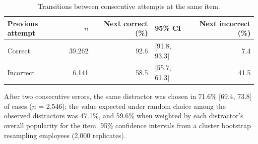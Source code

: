 \begin{table}[htbp]
\centering
\caption{Transitions between consecutive attempts at the same item.}
\label{tab:transitions}
\small
\begin{tabular}{lrrlr}
\toprule
Previous attempt & $n$ & Next correct (\%) & 95\% CI & Next incorrect (\%) \\
\midrule
Correct & 39,262 & 92.6 & [91.8, 93.3] & 7.4 \\
Incorrect & 6,141 & 58.5 & [55.7, 61.3] & 41.5 \\
\bottomrule
\end{tabular}

\vspace{2pt}
\parbox{\linewidth}{\footnotesize After two consecutive errors, the same distractor was chosen in 71.6\% [69.4, 73.8] of cases ($n$ = 2,546); the value expected under random choice among the observed distractors was 47.1\%, and 59.6\% when weighted by each distractor's overall popularity for the item. 95\% confidence intervals from a cluster bootstrap resampling employees (2,000 replicates).}
\end{table}
